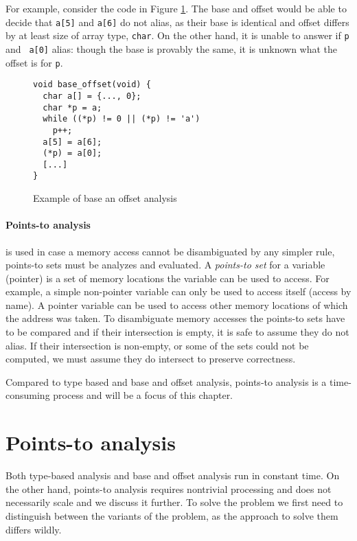 For example, consider the code in Figure \ref{figure-base-offset-example}. The
base and offset would be able to decide  that {\tt a[5]} and {\tt a[6]} do not
alias, as their base is identical and offset differs by at least size of array
type, {\tt char}. On the other hand, it is unable to answer if {\tt *p} and {\tt
a[0]} alias: though the base is provably the same, it is unknown what the offset
is for {\tt p}.

\begin{figure}[!ht]
\begin{tcolorbox}
\begin{verbatim}
void base_offset(void) {
  char a[] = {..., 0};
  char *p = a;
  while ((*p) != 0 || (*p) != 'a') 
    p++;
  a[5] = a[6];
  (*p) = a[0];
  [...]
}
\end{verbatim}
\end{tcolorbox}
\caption{Example of base an offset analysis}
\label{figure-base-offset-example}
\end{figure}

\paragraph{Points-to analysis} is used in case a memory access cannot be
disambiguated by any simpler rule, points-to sets must be analyzes and
evaluated. A {\it points-to set} for a variable (pointer) is a set of memory
locations the variable can be used to access. For example, a simple non-pointer
variable can only be used to access itself (access by name).  A pointer variable
can be used to access other memory locations of which the address was taken. To
disambiguate memory accesses the points-to sets have to be compared and if their
intersection is empty, it is safe to assume they do not alias. If their
intersection is non-empty, or some of the sets could not be computed, we must
assume they do intersect to preserve correctness.

Compared to type based and base and offset analysis, points-to analysis is a
time-consuming process and will be a focus of this chapter.


\section{Points-to analysis}

Both type-based analysis and base and offset analysis run in constant time. On
the other hand, points-to analysis requires nontrivial processing and does not
necessarily scale and we discuss it further. To solve the problem we first need
to distinguish between the variants of the problem, as the approach to solve
them differs wildly. 

